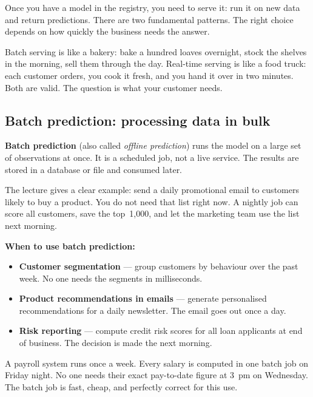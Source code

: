 \documentclass[a4paper,11pt]{article}
\newcommand{\vocab}[1]{\textbf{\color{navy}#1}}
\begin{document}
Once you have a model in the registry, you need to serve it: run it on new
data and return predictions. There are two fundamental patterns. The right
choice depends on how quickly the business needs the answer.

\begin{intuition}
Batch serving is like a bakery: bake a hundred loaves overnight, stock the
shelves in the morning, sell them through the day. Real-time serving is like
a food truck: each customer orders, you cook it fresh, and you hand it over
in two minutes. Both are valid. The question is what your customer needs.
\end{intuition}

\subsection{Batch prediction: processing data in bulk}

\vocab{Batch prediction} (also called \emph{offline prediction}) runs the
model on a large set of observations at once. It is a scheduled job, not a
live service. The results are stored in a database or file and consumed later.

The lecture gives a clear example: send a daily promotional email to customers
likely to buy a product. You do not need that list right now. A nightly job
can score all customers, save the top~1,000, and let the marketing team use
the list next morning.

\textbf{When to use batch prediction:}
\begin{itemize}
  \item \textbf{Customer segmentation} --- group customers by behaviour over
        the past week. No one needs the segments in milliseconds.
  \item \textbf{Product recommendations in emails} --- generate personalised
        recommendations for a daily newsletter. The email goes out once a day.
  \item \textbf{Risk reporting} --- compute credit risk scores for all loan
        applicants at end of business. The decision is made the next morning.
\end{itemize}

\begin{everyday}
A payroll system runs once a week. Every salary is computed in one batch job
on Friday night. No one needs their exact pay-to-date figure at 3~pm on
Wednesday. The batch job is fast, cheap, and perfectly correct for this use.
\end{everyday}
\end{document}
